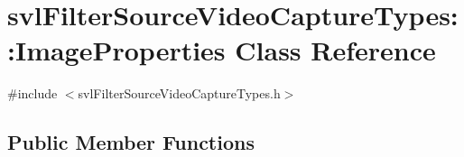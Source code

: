 \hypertarget{classsvl_filter_source_video_capture_types_1_1_image_properties}{}\section{svl\+Filter\+Source\+Video\+Capture\+Types\+:\+:Image\+Properties Class Reference}
\label{classsvl_filter_source_video_capture_types_1_1_image_properties}


{\ttfamily \#include $<$svl\+Filter\+Source\+Video\+Capture\+Types.\+h$>$}

\subsection*{Public Member Functions}
